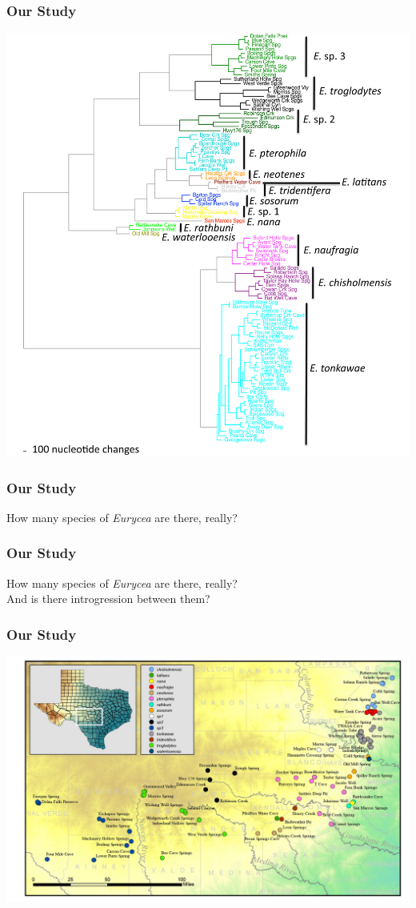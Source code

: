 \documentclass{beamer}
\begin{document}
\begin{frame}
\frametitle{Our Study}
\includegraphics[scale=0.5]{PrelimTree.jpg}
\end{frame}

\begin{frame}
\frametitle{Our Study}
How many species of \textit{Eurycea} are there, really? \\
\end{frame}

\begin{frame}
\frametitle{Our Study}
How many species of \textit{Eurycea} are there, really? \\
And is there introgression between them?
\end{frame}

\begin{frame}
\frametitle{Our Study}
    \includegraphics[scale=0.75]{distro.jpg}

\end{frame}
\end{document}
